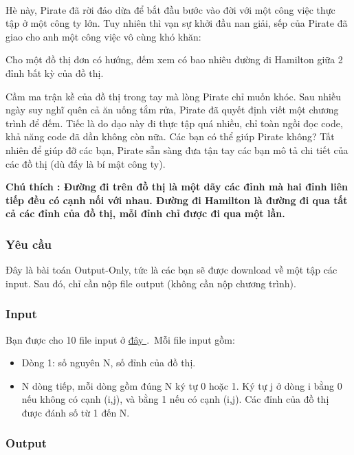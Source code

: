 

 

Hè này, Pirate đã rời đảo dừa để bắt đầu bước vào đời với một công việc thực tập ở một công ty lớn. Tuy nhiên thì vạn sự khởi đầu nan giải, sếp của Pirate đã giao cho anh một công việc vô cùng khó khăn:

Cho một đồ thị đơn có hướng, đếm xem có bao nhiêu đường đi Hamilton giữa 2 đỉnh bất kỳ của đồ thị.

Cầm ma trận kề của đồ thị trong tay mà lòng Pirate chỉ muốn khóc. Sau nhiều ngày suy nghĩ quên cả ăn uống tắm rửa, Pirate đã quyết định viết một chương trình để đếm. Tiếc là do dạo này đi thực tập quá nhiều, chỉ toàn ngồi đọc code, khả năng code đã dần không còn nữa. Các bạn có thể giúp Pirate không? Tất nhiên để giúp đỡ các bạn, Pirate sẵn sàng đưa tận tay các bạn mô tả chi tiết của các đồ thị (dù đấy là bí mật công ty).

\textbf{Chú thích : Đường đi trên đồ thị là một dãy các đỉnh mà hai đỉnh liên tiếp đều có cạnh nối với nhau. Đường đi Hamilton là đường đi qua tất cả các đỉnh của đồ thị, mỗi đỉnh chỉ được đi qua một lần. }

\subsubsection{Yêu cầu}

Đây là bài toán Output-Only, tức là các bạn sẽ được download về một tập các input. Sau đó, chỉ cần nộp file output (không cần nộp chương trình).

\subsubsection{Input}

Bạn được cho 10 file input ở \href{https://www.dropbox.com/s/rsc403hk54lye08/VMCOUNT.zip?dl=0}{ đây } . Mỗi file input gồm:
\begin{itemize}
	\item Dòng 1: số nguyên N, số đỉnh của đồ thị.
	\item N dòng tiếp, mỗi dòng gồm đúng N ký tự 0 hoặc 1. Ký tự j ở dòng i bằng 0 nếu không có cạnh (i,j), và bằng 1 nếu có cạnh (i,j). Các đỉnh của đồ thị được đánh số từ 1 đến N.
\end{itemize}

\subsubsection{Output}

